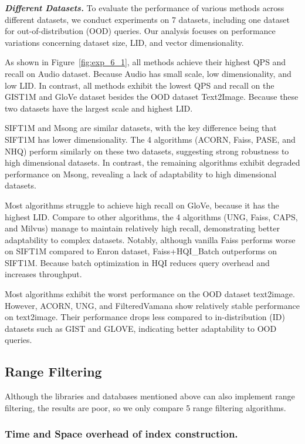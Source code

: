 \documentclass[sigconf, nonacm]{acmart}
\begin{document}
	\textit{\textbf{Different Datasets.}}  
	To evaluate the performance of various methods across different datasets, we conduct experiments on 7 datasets, including one dataset for out-of-distribution (OOD) queries. Our analysis focuses on performance variations concerning dataset size, LID, and vector dimensionality.
	
	As shown in Figure~\ref{fig:exp_6_1}, all methods achieve their highest QPS and recall on Audio dataset. Because Audio has small scale, low dimensionality, and low LID. In contrast, all methods exhibit the lowest QPS and recall on the GIST1M and GloVe dataset besides the OOD dataset Text2Image. Because these two datasets have the largest scale and highest LID.
	
	SIFT1M and Msong are similar datasets, with the key difference being that SIFT1M has lower dimensionality. The 4 algorithms (ACORN, Faiss, PASE, and NHQ) perform similarly on these two datasets, suggesting strong robustness to high dimensional datasets. In contrast, the remaining algorithms exhibit degraded performance on Msong, revealing a lack of adaptability to high dimensional datasets.
	
	Most algorithms struggle to achieve high recall on GloVe, because it has the highest LID. Compare to other algorithms, the 4 algorithms (UNG, Faiss, CAPS, and Milvus) manage to maintain relatively high recall, demonstrating better adaptability to complex datasets. Notably, although vanilla Faiss performs worse on SIFT1M compared to Enron dataset, Faiss+HQI\_Batch outperforms on SIFT1M. Because batch optimization in HQI reduces query overhead and increases throughput.
	
	Most algorithms exhibit the worst performance on the OOD dataset text2image. However, ACORN, UNG, and FilteredVamana show relatively stable performance on text2image. Their performance drops less compared to in-distribution (ID) datasets such as GIST and GLOVE, indicating better adaptability to OOD queries.
	
	\subsection{Range Filtering}
	Although the libraries and databases mentioned above can also implement range filtering, the results are poor, so we only compare 5 range filtering algorithms.
	\subsubsection{Time and Space overhead of index construction.}
	
\end{document}
